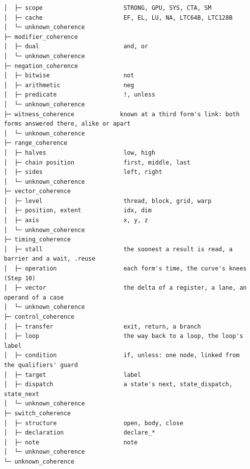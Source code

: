 \begin{Verbatim}
│  ├─ scope                       STRONG, GPU, SYS, CTA, SM
│  ├─ cache                       EF, EL, LU, NA, LTC64B, LTC128B
│  └─ unknown_coherence
├─ modifier_coherence
│  ├─ dual                        and, or
│  └─ unknown_coherence
├─ negation_coherence
│  ├─ bitwise                     not
│  ├─ arithmetic                  neg
│  ├─ predicate                   !, unless
│  └─ unknown_coherence
├─ witness_coherence             known at a third form's link: both forms answered there, alike or apart
│  └─ unknown_coherence
├─ range_coherence
│  ├─ halves                      low, high
│  ├─ chain position              first, middle, last
│  ├─ sides                       left, right
│  └─ unknown_coherence
├─ vector_coherence
│  ├─ level                       thread, block, grid, warp
│  ├─ position, extent            idx, dim
│  ├─ axis                        x, y, z
│  └─ unknown_coherence
├─ timing_coherence
│  ├─ stall                       the soonest a result is read, a barrier and a wait, .reuse
│  ├─ operation                   each form's time, the curve's knees (Step 10)
│  ├─ vector                      the delta of a register, a lane, an operand of a case
│  └─ unknown_coherence
├─ control_coherence
│  ├─ transfer                    exit, return, a branch
│  ├─ loop                        the way back to a loop, the loop's label
│  ├─ condition                   if, unless: one node, linked from the qualifiers' guard
│  ├─ target                      label
│  ├─ dispatch                    a state's next, state_dispatch, state_next
│  └─ unknown_coherence
├─ switch_coherence
│  ├─ structure                   open, body, close
│  ├─ declaration                 declare_*
│  ├─ note                        note
│  └─ unknown_coherence
└─ unknown_coherence
\end{Verbatim}

